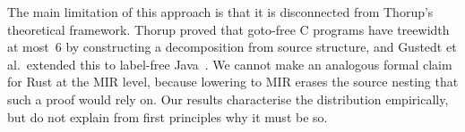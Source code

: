 The main limitation of this approach is that it is disconnected from Thorup's theoretical framework.
Thorup proved that goto-free C programs have treewidth at most~6 by constructing a decomposition from source structure, and Gustedt et al.\ extended this to label-free Java~\cite{thorup_1998,gustedt_2002}.
We cannot make an analogous formal claim for Rust at the MIR level, because lowering to MIR erases the source nesting that such a proof would rely on.
Our results characterise the distribution empirically, but do not explain from first principles why it must be so.
